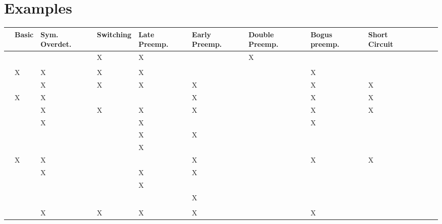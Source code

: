 \documentclass[11pt,a4paper]{book}
\theoremstyle{definition}
\theoremstyle{definition}
\theoremstyle{definition}
\theoremstyle{remark}
\begin{document}
%

\section{Examples}


 \begin{table}
\centering
\scriptsize
\begin{tabular}{lp{1.25cm}p{1.25cm}p{1.25cm}p{1.15cm}p{1.25cm}p{1.25cm}p{1.25cm}p{1.25cm}p{1.25cm}p{1.25cm}p{1.25cm}}
\toprule
	& Basic	& Sym. Overdet.	& Switching	& Late Preemp.	& Early Preemp.	& Double Preemp.	& Bogus preemp.	& Short Circuit	\\
	\midrule 	 	 	 	 	 	 	 	 
	 	 	 	 	 	 	 	 	 
	 	 	 	 	 	 	 	 	 
	 	 	 	 	 	 	 	 	 
 \cite{glymour2010actual}	& 	& 	& X	& X	& 	& X	& 	& 	 \\ 
	 	 	 	 	 	 	 	 	 
 \cite{gerstenberg2010spreading}	& 	& 	& 	& 	& 	& 	& 	& 	 \\ 
 \cite{halpern2011actual} 	& X	& X	& X	& X	& 	& 	& X	& 	 \\ 
	 	 	 	 	 	 	 	 	 
	 	 	 	 	 	 	 	 	 
 \cite{baumgartner2013regularity} 	& 	& X	& X	& X	& X	& 	& X	& X	 \\ 
	 	 	 	 	 	 	 	 	 
 \cite{halpern2015graded} 	& X	& X	& 	& 	& X	& 	& X	& X	 \\ 
 \cite{weslake2015partial} 	& 	& X	& X	& X	& X	& 	& X	& X	 \\ 
 \cite{chockler2015causal}  	& 	& X	& 	& X	& 	& 	& X	& 	 \\ 
 \cite{beckers2016general} 	& 	& 	& 	& X	& X	& 	& 	& 	 \\ 
	 	 	 	 	 	 	 	 	 
 \cite{halpern2016appropriate} 	& 	& 	& 	& X	& 	& 	& 	& 	 \\ 
 \cite{blanchard2017cause}  	& X	& X	& 	& 	& X	& 	& X	& X	 \\ 
 \cite{wright2017ness}  	& 	& X	& 	& X	& X	& 	& 	& 	 \\ 
	 	 	 	 	 	 	 	 	 
 \cite{aleksandrowicz2017computational}  	& 	& 	& 	& X	& 	& 	& 	& 	 \\ 
 \cite{fenton2017proposed}  	& 	& 	& 	& 	& X	& 	& 	& 	 \\ 
 \cite{lagnado2017causation}  	& 	& 	& 	& 	& 	& 	& 	& 	 \\ 
 \cite{bochman2018actual}  	& 	& X	& X	& X	& X	& 	& X	& 	 \\ 
	 	 	 	 	 	 	 	 	 

\end{tabular}
\end{table}
\end{document}
